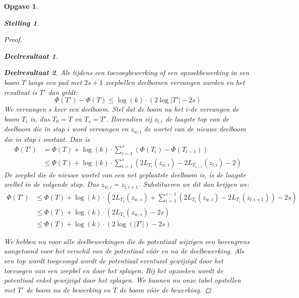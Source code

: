 \documentclass[12pt,hidelinks]{article}
\newtheorem{opgave}{Opgave}
\newtheorem{stelling}{Stelling}
\newtheorem{deelresultaat}{Deelresultaat}
\begin{document}
\begin{opgave}
\begin{description}
\begin{stelling}
\begin{proof}
\begin{deelresultaat}
                        \end{deelresultaat}
                        \begin{deelresultaat}
                        Als tijdens een toevoegbewerking of een opzoekbewerking in een boom $T$ langs een pad met $2s+1$ zeepbellen deelbomen vervangen worden en het resultaat is $T'$ dan geldt:
                        \normalfont
                        $$\Phi(T')-\Phi(T) \le \log(k)\cdot(2\log|T'| - 2s)$$
                        We vervangen $s$ keer een deelboom. 
                        Stel dat de boom na het $i$-de vervangen de boom $T_i$ is, dus $T_0=T$ en $T_s=T'$.
                        Bovendien zij $z_{l,i}$ de laagste top van de deelboom die in stap $i$ word vervangen en $z_{w,i}$ de wortel van de nieuwe deelboom die in stap $i$ onstaat. Dan is
                        \begin{align*}
                            \Phi(T') &= \Phi(T) + \log(k)\cdot\sum_{i=1}^{s}{(\Phi(T_i)-\Phi(T_{i-1}))}\\                                
                            &\le \Phi(T) + \log(k)\cdot\sum_{i=1}^{s}{(2L_{T_i}(z_{w,i})-2L_{T_{i-1}}(z_{l,i})-2)}
                        \end{align*}
                        De zeepbel die de nieuwe wortel van een net geplaatste deelboom is,
                        is de laagste zeelbel in de volgende stap.
                        Dus $z_{w,i}=z_{l,i+1}$. Substitueren we dit dan krijgen we:
                        \begin{align*}
                            \Phi(T') &\le \Phi(T) + \log(k)\cdot(2L_{T_s}(z_{w,s})+\sum_{i=1}^{s-1}{(2L_{T_i}(z_{w,i})-2L_{T_i}(z_{l,i+1}))} - 2s)\\
                            &\le \Phi(T)+\log(k)\cdot (2L_{T_s}(z_{w,s}) - 2s )\\
                            &\le \Phi(T) + \log(k)\cdot( 2\log(|T'|)-2s)
                        \end{align*}
                        \end{deelresultaat}
                        We hebben nu voor alle deelbewerkingen die de potentiaal wijzigen een bovengrens aangetoond voor het verschil van de potentiaal vóór en na de deelbewerking.
                        Als een top wordt toegevoegd wordt de potentiaal eventueel gewijzigd door het toevoegen van een zeepbel en door het splayen.
                        Bij het opzoeken wordt de potentiaal enkel gewijzigd door het splayen.
                        We kunnen nu onze tabel opstellen met $T'$ de boom na de bewerking en $T$ de boom vóór de bewerking.

\end{proof}
\end{stelling}
\end{description}
\end{opgave}
\end{document}
